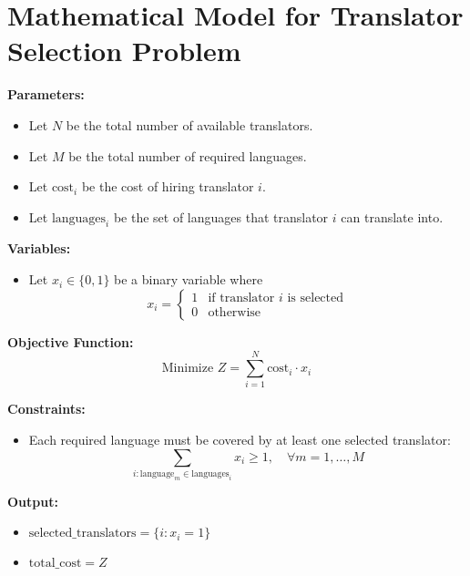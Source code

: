 \documentclass{article}
\begin{document}
\section*{Mathematical Model for Translator Selection Problem}

\textbf{Parameters:}
\begin{itemize}
    \item Let \( N \) be the total number of available translators.
    \item Let \( M \) be the total number of required languages.
    \item Let \( \text{cost}_i \) be the cost of hiring translator \( i \).
    \item Let \( \text{languages}_i \) be the set of languages that translator \( i \) can translate into.
\end{itemize}

\textbf{Variables:}
\begin{itemize}
    \item Let \( x_i \in \{0, 1\} \) be a binary variable where 
        \[
        x_i = \begin{cases} 
        1 & \text{if translator } i \text{ is selected} \\ 
        0 & \text{otherwise}
        \end{cases}
        \]
\end{itemize}

\textbf{Objective Function:}
\[
\text{Minimize } Z = \sum_{i=1}^{N} \text{cost}_i \cdot x_i
\]

\textbf{Constraints:}
\begin{itemize}
    \item Each required language must be covered by at least one selected translator:
    \[
    \sum_{i: \text{language}_m \in \text{languages}_i} x_i \geq 1, \quad \forall m = 1, \ldots, M
    \]
\end{itemize}

\textbf{Output:}
\begin{itemize}
    \item \( \text{selected\_translators} = \{i : x_i = 1\} \)
    \item \( \text{total\_cost} = Z \)
\end{itemize}
\end{document}

